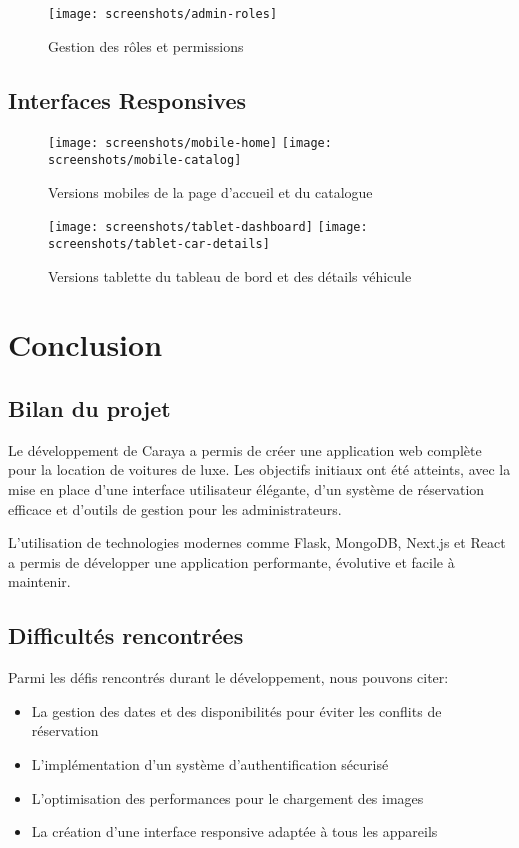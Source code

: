 \documentclass[12pt,a4paper]{report}
\begin{document}
\begin{figure}[H]
    \centering
    \texttt{[image: screenshots/admin-roles]}
    \caption{Gestion des rôles et permissions}
\end{figure}

\section{Interfaces Responsives}
\begin{figure}[H]
    \centering
    \texttt{[image: screenshots/mobile-home]}
    \texttt{[image: screenshots/mobile-catalog]}
    \caption{Versions mobiles de la page d'accueil et du catalogue}
\end{figure}

\begin{figure}[H]
    \centering
    \texttt{[image: screenshots/tablet-dashboard]}
    \texttt{[image: screenshots/tablet-car-details]}
    \caption{Versions tablette du tableau de bord et des détails véhicule}
\end{figure}

\chapter{Conclusion}
\section{Bilan du projet}
Le développement de Caraya a permis de créer une application web complète pour la location de voitures de luxe. Les objectifs initiaux ont été atteints, avec la mise en place d'une interface utilisateur élégante, d'un système de réservation efficace et d'outils de gestion pour les administrateurs.

L'utilisation de technologies modernes comme Flask, MongoDB, Next.js et React a permis de développer une application performante, évolutive et facile à maintenir.

\section{Difficultés rencontrées}
Parmi les défis rencontrés durant le développement, nous pouvons citer:
\begin{itemize}
    \item La gestion des dates et des disponibilités pour éviter les conflits de réservation
    \item L'implémentation d'un système d'authentification sécurisé
    \item L'optimisation des performances pour le chargement des images
    \item La création d'une interface responsive adaptée à tous les appareils
\end{itemize}
\end{document}
